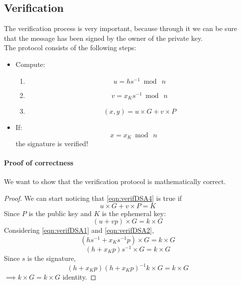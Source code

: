 \subsection{Verification}
The verification process is very important, because through it we can be sure that the message has been signed by the owner of the private key.\\
The protocol consists of the following steps:
\begin{itemize}
	\item Compute:
	\begin{enumerate}
		\item \begin{equation}
			  \label{eqn:verifDSA1}
			  u = hs^{-1} \bmod\ n
			  \end{equation}
		\item \begin{equation}
			  \label{eqn:verifDSA2}
			  v = x_{K}s^{-1} \bmod\ n
			  \end{equation}
		\item \begin{equation}
			  \label{eqn:verifDSA3}
			  (x,y)=u\times G+ v\times P
			  \end{equation}
	 \end{enumerate}
 	\item If:
 	\begin{equation}
 	\label{eqn:verifDSA4}
 	x=x_{K}\bmod\ n
 	\end{equation} the signature is verified!
\end{itemize}

\paragraph{Proof of correctness}
We want to show that the verification protocol is mathematically correct.
\begin{proof}
	We can start noticing that \eqref{eqn:verifDSA4} is true if 
	\begin{equation}
	u\times G+ v\times P=K
	\end{equation}
	Since $P$ is the public key and $K$ is the ephemeral key:
	\begin{equation}
	(u+vp)\times G= k\times G
	\end{equation}
	Considering \eqref{eqn:verifDSA1} and \eqref{eqn:verifDSA2},
	\begin{equation}
	(hs^{-1}+x_{K}s^{-1}p)\times G= k\times G
	\end{equation}
	\begin{equation}
	(h+x_{K}p)s^{-1}\times G= k\times G
	\end{equation}
	Since $s$ is the signature,
	\begin{equation}
	(h+x_{K}p)(h+x_{K}p)^{-1}k\times G= k\times G
	\end{equation}
	$\implies k\times G=k\times G$ identity.
\end{proof}

